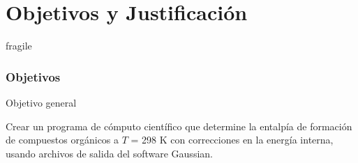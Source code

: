 \documentclass{beamer}
\begin{document}

\section{Objetivos y Justificación}

\begin{frame}{fragile}
\frametitle{Objetivos}

\begin{block}{Objetivo general}

Crear un programa de cómputo científico que determine la entalpía de formación de compuestos orgánicos a $T$ = 298 K con correcciones en la energía interna, usando archivos de salida del software Gaussian.
\end{block}

\end{frame}

\end{document}

